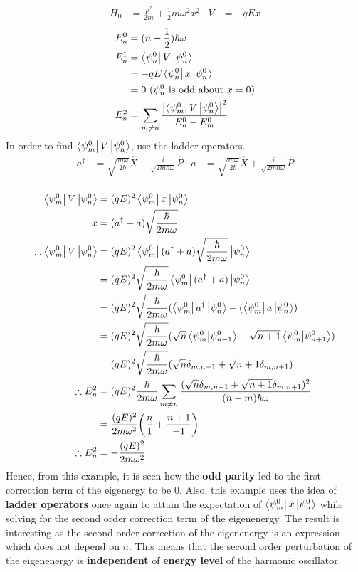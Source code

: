 \documentclass{article}
\begin{document}
\begin{flushleft}
\begin{align*}
    H_0&=\frac{p^2}{2m}+\frac{1}{2}m\omega^2x^2 & V&=-qEx
\end{align*}
\begin{align*}
   E_n^0&=(n+\frac{1}{2})\hbar\omega\\
    E_n^1&=\bra{\psi_n^0}V\ket{\psi_n^0}\\
    &=-qE\bra{\psi_n^0}x\ket{\psi_n^0}\\
    &=0\ (\psi_n^0\ \text{is odd about}\ x=0)\\
    E_n^2&=\sum_{m\neq n}\frac{\abs{\bra{\psi_m^0}V\ket{\psi_n^0}}^2}{E_n^0-E_m^0}\\
    \end{align*}
In order to find $\bra{\psi_m^0}V\ket{\psi_n^0}$, use the ladder operators.
\begin{align*}
    a^\dagger&=\sqrt{\frac{m\omega}{2\hbar}}\hat{X}-\frac{i}{\sqrt{2m\hbar\omega}}\hat{P} &
    a&=\sqrt{\frac{m\omega}{2\hbar}}\hat{X}+\frac{i}{\sqrt{2m\hbar\omega}}\hat{P}\\[0.5cm]
\end{align*}

\begin{align*}
    \bra{\psi_m^0}V\ket{\psi_n^0}&=(qE)^2\bra{\psi_m^0}x\ket{\psi_n^0}\\
    x&=(a^\dagger+a)\sqrt{\frac{\hbar}{2m\omega}}\\
    \therefore \bra{\psi_m^0}V\ket{\psi_n^0}&=(qE)^2\bra{\psi_m^0}(a^\dagger+a)\sqrt{\frac{\hbar}{2m\omega}}\ket{\psi_n^0}\\
    &=(qE)^2\sqrt{\frac{\hbar}{2m\omega}}\bra{\psi_m^0}(a^\dagger+a)\ket{\psi_n^0}\\
    &=(qE)^2\sqrt{\frac{\hbar}{2m\omega}}(\bra{\psi_m^0}a^\dagger\ket{\psi_n^0}+(\bra{\psi_m^0}a\ket{\psi_n^0})\\
    &=(qE)^2\sqrt{\frac{\hbar}{2m\omega}}(\sqrt{n}\bra{\psi_m^0}\ket{\psi_{n-1}^0}+\sqrt{n+1}\bra{\psi_m^0}\ket{\psi_{n+1}^0})\\
    &=(qE)^2\sqrt{\frac{\hbar}{2m\omega}}(\sqrt{n}\delta_{m,n-1}+\sqrt{n+1}\delta_{m,n+1})\\
    \therefore E_n^2&=(qE)^2\frac{\hbar}{2m\omega}\sum_{m\neq n}\frac{(\sqrt{n}\delta_{m,n-1}+\sqrt{n+1}\delta_{m,n+1})^2}{(n-m)\hbar\omega}\\
    &=\frac{(qE)^2}{2m\omega^2}\bigg(\frac{n}{1}+\frac{n+1}{-1}\bigg)\\
    \therefore E_n^2&=-\frac{(qE)^2}{2m\omega^2}
    \end{align*}
Hence, from this example, it is seen how the \textbf{odd parity} led to the first correction term of the eigenergy to be 0. Also, this example uses the idea of \textbf{ladder operators} once again to attain the expectation of $\bra{\psi_m^0}x\ket{\psi_n^0}$ while solving for the second order correction term of the eigenenergy. The result is interesting as the second order correction of the eigenenergy is an expression which does not depend on $n$. This means that the second order perturbation of the eigenenergy is \textbf{independent} of \textbf{energy level} of the harmonic oscillator.
\pagebreak


\end{flushleft}
\end{document}
